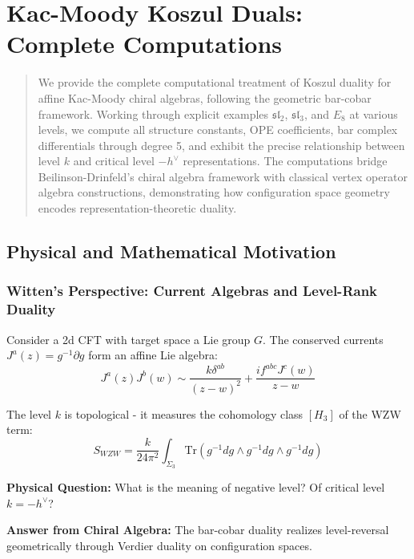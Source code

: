 
\chapter{Kac-Moody Koszul Duals: Complete Computations}\label{chap:kac-moody-koszul}

\begin{abstract}
We provide the complete computational treatment of Koszul duality for affine Kac-Moody chiral algebras, following the geometric bar-cobar framework. Working through explicit examples $\mathfrak{sl}_2$, $\mathfrak{sl}_3$, and $E_8$ at various levels, we compute all structure constants, OPE coefficients, bar complex differentials through degree 5, and exhibit the precise relationship between level $k$ and critical level $-h^\vee$ representations. The computations bridge Beilinson-Drinfeld's chiral algebra framework with classical vertex operator algebra constructions, demonstrating how configuration space geometry encodes representation-theoretic duality.
\end{abstract}

\section{Physical and Mathematical Motivation}

\subsection{Witten's Perspective: Current Algebras and Level-Rank Duality}

\begin{motivation}
Consider a 2d CFT with target space a Lie group $G$. The conserved currents $J^a(z) = g^{-1}\partial g$ form an affine Lie algebra:
$$J^a(z) J^b(w) \sim \frac{k \delta^{ab}}{(z-w)^2} + \frac{if^{abc} J^c(w)}{z-w}$$

The level $k$ is topological - it measures the cohomology class $[H_3]$ of the WZW term:
$$S_{WZW} = \frac{k}{24\pi^2} \int_{\Sigma_3} \text{Tr}(g^{-1}dg \wedge g^{-1}dg \wedge g^{-1}dg)$$

\textbf{Physical Question:} What is the meaning of negative level? Of critical level $k = -h^\vee$?

\textbf{Answer from Chiral Algebra:} The bar-cobar duality realizes level-reversal geometrically through Verdier duality on configuration spaces.
\end{motivation}

